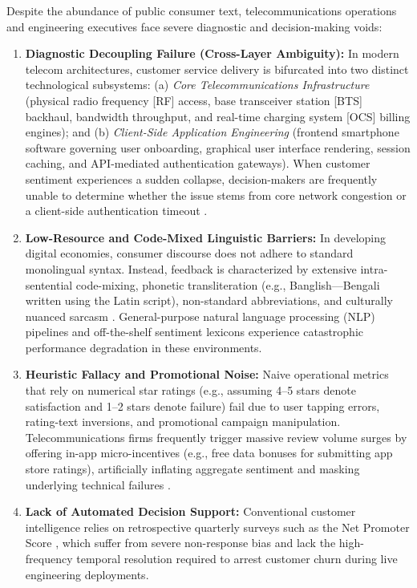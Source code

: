 \documentclass[5p,twocolumn,authoryear]{elsarticle}
\begin{document}
Despite the abundance of public consumer text, telecommunications operations and engineering executives face severe diagnostic and decision-making voids:
\begin{enumerate}
    \item \textbf{Diagnostic Decoupling Failure (Cross-Layer Ambiguity):} In modern telecom architectures, customer service delivery is bifurcated into two distinct technological subsystems: (a) \textit{Core Telecommunications Infrastructure} (physical radio frequency [RF] access, base transceiver station [BTS] backhaul, bandwidth throughput, and real-time charging system [OCS] billing engines); and (b) \textit{Client-Side Application Engineering} (frontend smartphone software governing user onboarding, graphical user interface rendering, session caching, and API-mediated authentication gateways). When customer sentiment experiences a sudden collapse, decision-makers are frequently unable to determine whether the issue stems from core network congestion or a client-side authentication timeout \citep{parasuraman2005esqual, maxham2001service}.
    \item \textbf{Low-Resource and Code-Mixed Linguistic Barriers:} In developing digital economies, consumer discourse does not adhere to standard monolingual syntax. Instead, feedback is characterized by extensive intra-sentential code-mixing, phonetic transliteration (e.g., Banglish---Bengali written using the Latin script), non-standard abbreviations, and culturally nuanced sarcasm \citep{bhattacharjee2022banglabert, rahman2021deep, sazzed2021cross}. General-purpose natural language processing (NLP) pipelines and off-the-shelf sentiment lexicons experience catastrophic performance degradation in these environments.
    \item \textbf{Heuristic Fallacy and Promotional Noise:} Naive operational metrics that rely on numerical star ratings (e.g., assuming 4--5 stars denote satisfaction and 1--2 stars denote failure) fail due to user tapping errors, rating-text inversions, and promotional campaign manipulation. Telecommunications firms frequently trigger massive review volume surges by offering in-app micro-incentives (e.g., free data bonuses for submitting app store ratings), artificially inflating aggregate sentiment and masking underlying technical failures \citep{hu2008overcoming, keiningham2007longitudinal}.
    \item \textbf{Lack of Automated Decision Support:} Conventional customer intelligence relies on retrospective quarterly surveys such as the Net Promoter Score \citep[NPS;][]{reichheld2003one}, which suffer from severe non-response bias and lack the high-frequency temporal resolution required to arrest customer churn during live engineering deployments.
\end{enumerate}
\end{document}
